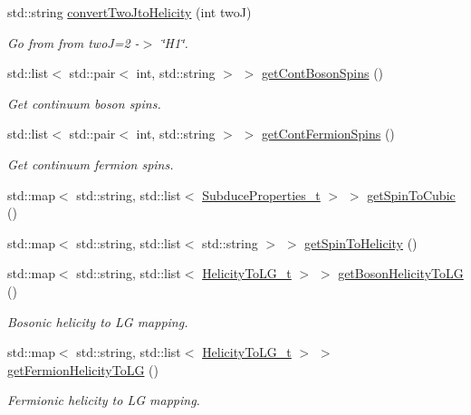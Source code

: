 \begin{DoxyCompactItemize}
std\+::string \mbox{\hyperlink{namespaceHadron_a354d39c9f601a0a0f19857eb4b79a2d2}{convert\+Two\+Jto\+Helicity}} (int twoJ)
\begin{DoxyCompactList}\small\item\em Go from from twoJ=2 -\/$>$ \char`\"{}\+H1\char`\"{}. \end{DoxyCompactList}\item 
std\+::list$<$ std\+::pair$<$ int, std\+::string $>$ $>$ \mbox{\hyperlink{namespaceHadron_a758e677215948a2af60fc6fee269d410}{get\+Cont\+Boson\+Spins}} ()
\begin{DoxyCompactList}\small\item\em Get continuum boson spins. \end{DoxyCompactList}\item 
std\+::list$<$ std\+::pair$<$ int, std\+::string $>$ $>$ \mbox{\hyperlink{namespaceHadron_a7131ce7dd50310f2beeabb2a83dde484}{get\+Cont\+Fermion\+Spins}} ()
\begin{DoxyCompactList}\small\item\em Get continuum fermion spins. \end{DoxyCompactList}\item 
std\+::map$<$ std\+::string, std\+::list$<$ \mbox{\hyperlink{structHadron_1_1SubduceProperties__t}{Subduce\+Properties\+\_\+t}} $>$ $>$ \mbox{\hyperlink{namespaceHadron_a0ad570b7ce2fbc8f215d0a5ee08afdb2}{get\+Spin\+To\+Cubic}} ()
\item 
std\+::map$<$ std\+::string, std\+::list$<$ std\+::string $>$ $>$ \mbox{\hyperlink{namespaceHadron_a65015bc93f8b83c79f094361b407ed28}{get\+Spin\+To\+Helicity}} ()
\item 
std\+::map$<$ std\+::string, std\+::list$<$ \mbox{\hyperlink{structHadron_1_1HelicityToLG__t}{Helicity\+To\+L\+G\+\_\+t}} $>$ $>$ \mbox{\hyperlink{namespaceHadron_a82bbcfd69a36dd0f63d6181069ff7393}{get\+Boson\+Helicity\+To\+LG}} ()
\begin{DoxyCompactList}\small\item\em Bosonic helicity to LG mapping. \end{DoxyCompactList}\item 
std\+::map$<$ std\+::string, std\+::list$<$ \mbox{\hyperlink{structHadron_1_1HelicityToLG__t}{Helicity\+To\+L\+G\+\_\+t}} $>$ $>$ \mbox{\hyperlink{namespaceHadron_af7b75d50b2ca47d90a4d42ff7152bf4d}{get\+Fermion\+Helicity\+To\+LG}} ()
\begin{DoxyCompactList}\small\item\em Fermionic helicity to LG mapping. \end{DoxyCompactList}\item 

\end{DoxyCompactItemize}
